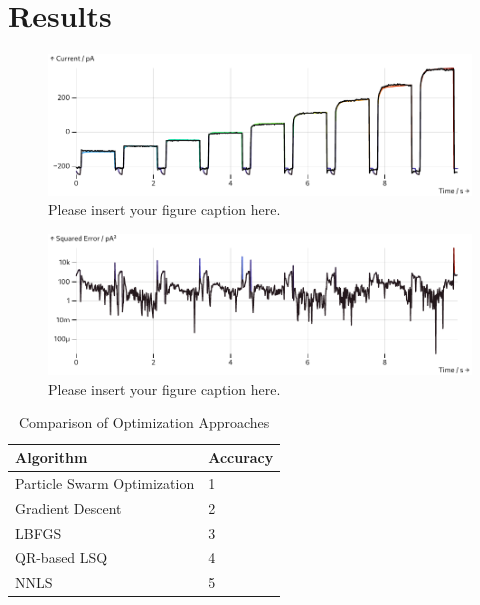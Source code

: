 \documentclass[USenglish,twocolumn]{article}
\begin{document}
  \section{Results}
  \begin{figure}[h]
    \includegraphics[width=\columnwidth]{../figures/results/full-simulation-current.pdf}
    \caption{Please insert your figure caption here.}
    \label{figure:full-simulation-current}
  \end{figure}
  \begin{figure}
    \includegraphics[width=\columnwidth]{../figures/results/simulation-error.pdf}
    \caption{Please insert your figure caption here.}
    \label{figure:simulation-error}
  \end{figure}

  \begin{table}
    \caption{Comparison of Optimization Approaches}
    \begin{tabular}{ll}
      \textbf{Algorithm}          & \textbf{Accuracy} \\
      \midrule
      Particle Swarm Optimization & 1                 \\
      Gradient Descent            & 2                 \\
      LBFGS                       & 3                 \\
      QR-based LSQ                & 4                 \\
      NNLS                        & 5                 \\
    \end{tabular}
    \label{table:optimization-comparison}
  \end{table}
\end{document}
